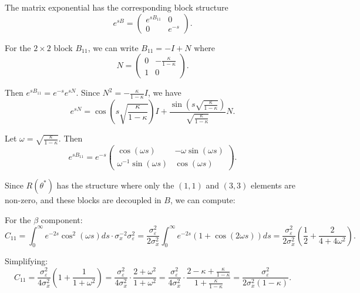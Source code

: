 \documentclass[11pt]{article}
\begin{document}
The matrix exponential has the corresponding block structure
\begin{equation}
    e^{sB} = \begin{pmatrix}
        e^{sB_{11}} & 0 \\
        0 & e^{-s}
    \end{pmatrix}.
\end{equation}

For the $2 \times 2$ block $B_{11}$, we can write $B_{11} = -I + N$ where
\begin{equation}
    N = \begin{pmatrix}
        0 & -\frac{\kappa}{1-\kappa} \\
        1 & 0
    \end{pmatrix}.
\end{equation}

Then $e^{sB_{11}} = e^{-s} e^{sN}$. Since $N^2 = -\frac{\kappa}{1-\kappa} I$, we have
\begin{equation}
    e^{sN} = \cos\left(s\sqrt{\frac{\kappa}{1-\kappa}}\right) I + \frac{\sin\left(s\sqrt{\frac{\kappa}{1-\kappa}}\right)}{\sqrt{\frac{\kappa}{1-\kappa}}} N.
\end{equation}

Let $\omega = \sqrt{\frac{\kappa}{1-\kappa}}$. Then
\begin{equation}
    e^{sB_{11}} = e^{-s} \begin{pmatrix}
        \cos(\omega s) & -\omega \sin(\omega s) \\
        \omega^{-1} \sin(\omega s) & \cos(\omega s)
    \end{pmatrix}.
\end{equation}

Since $R(\theta^*)$ has the structure where only the $(1,1)$ and $(3,3)$ elements are non-zero, and these blocks are decoupled in $B$, we can compute:

For the $\beta$ component:
\begin{equation}
    C_{11} = \int_0^\infty e^{-2s} \cos^2(\omega s) ds \cdot \sigma^{-2}_x \sigma^2_\varepsilon = \frac{\sigma^2_\varepsilon}{2\sigma^2_x} \int_0^\infty e^{-2s} (1 + \cos(2\omega s)) ds = \frac{\sigma^2_\varepsilon}{2\sigma^2_x} \left(\frac{1}{2} + \frac{2}{4 + 4\omega^2}\right).
\end{equation}

Simplifying:
\begin{equation}
    C_{11} = \frac{\sigma^2_\varepsilon}{4\sigma^2_x} \left(1 + \frac{1}{1 + \omega^2}\right) = \frac{\sigma^2_\varepsilon}{4\sigma^2_x} \cdot \frac{2 + \omega^2}{1 + \omega^2} = \frac{\sigma^2_\varepsilon}{4\sigma^2_x} \cdot \frac{2 - \kappa + \frac{\kappa}{1-\kappa}}{1 + \frac{\kappa}{1-\kappa}} = \frac{\sigma^2_\varepsilon}{2\sigma^2_x(1-\kappa)}.
\end{equation}
\end{document}

